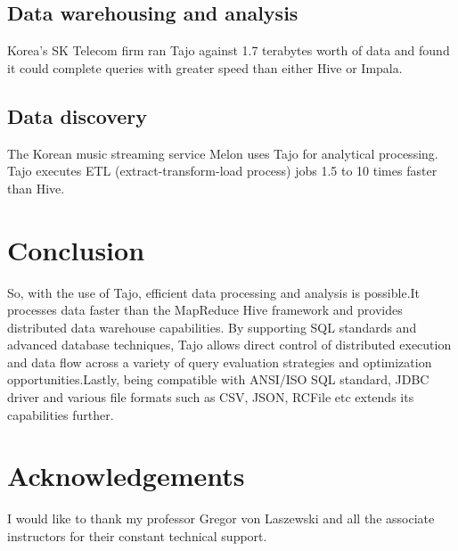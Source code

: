 \documentclass[9pt,twocolumn,twoside]{styles/osajnl}
\begin{document}
\subsection{Data warehousing and analysis}
Korea's SK Telecom firm \cite{www-apache-tajo-tutorialspoint} ran Tajo against 1.7 terabytes worth of data and found
it could complete queries with greater speed than either Hive or
Impala.

\subsection{Data discovery}
The Korean music streaming \cite{www-apache-tajo-tutorialspoint}
service Melon uses Tajo for analytical processing. Tajo executes ETL
(extract-transform-load process) jobs 1.5 to 10 times faster than
Hive.

\section{Conclusion}
So, with the use of \cite{www-apache-tajo} Tajo, efficient data
processing and analysis is possible.It processes data faster than the
MapReduce Hive framework and provides distributed data warehouse
capabilities. By supporting SQL standards and advanced database
techniques, Tajo allows direct control of distributed execution and
data flow across a variety of query evaluation strategies and
optimization opportunities.Lastly, being compatible with ANSI/ISO SQL
standard, JDBC driver and various file formats such as CSV, JSON,
RCFile etc extends its capabilities further.

\section*{Acknowledgements}

I would like to thank my professor Gregor von Laszewski and all the
associate instructors for their constant technical support.



 


\newpage

\appendix
\end{document}
